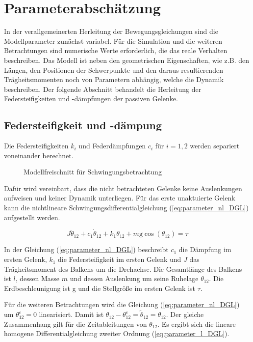 \newpage
\chapter{Parameterabschätzung}

In der verallgemeinerten Herleitung der Bewegungsgleichungen sind die Modellparameter zunächst variabel. Für die Simulation und die weiteren Betrachtungen sind numerische Werte erforderlich, die das reale Verhalten beschreiben. Das Modell ist neben den geometrischen Eigenschaften, wie z.B. den Längen, den Positionen der Schwerpunkte und den daraus resultierenden Trägheitsmomenten noch von Parametern abhängig, welche die Dynamik beschreiben. Der folgende Abschnitt behandelt die Herleitung der Federsteifigkeiten und -dämpfungen der passiven Gelenke.

\section{Federsteifigkeit und -dämpung}
\label{abs:Federparameter}
Die Federsteifigkeiten $k_i$ und Federdämpfungen $c_i$ für $i=1,2$ werden separiert voneinander berechnet. 

\begin{figure}[h]
	\centering
	
	\caption[Modellparameter]{Modellfreischnitt für Schwingungsbetrachtung}
	\label{fig:parameter_abschaetung}
\end{figure}

Dafür wird vereinbart, dass die nicht betrachteten Gelenke keine Auslenkungen aufweisen und keiner Dynamik unterliegen. 
Für das erste unaktuierte Gelenk kann die nichtlineare Schwingungsdifferentialgleichung (\ref{eq:parameter_nl_DGL}) aufgestellt werden. 

\begin{equation} \label{eq:parameter_nl_DGL}
J\ddot{\theta}_{12}+c_1\dot{\theta}_{12}+k_1\theta_{12}+m\mathrm{g}\cos(\theta_{12})=\tau
\end{equation}

In der Gleichung (\ref{eq:parameter_nl_DGL}) beschreibt $c_1$ die Dämpfung im ersten Gelenk, $k_1$ die Federsteifigkeit im ersten Gelenk und $J$ das Trägheitsmoment des Balkens um die Drehachse. Die Gesamtlänge des Balkens ist $l$, dessen Masse $m$ und dessen Auslenkung um seine Ruhelage $\theta_{12}$. Die Erdbeschleunigung ist g und die Stellgröße im ersten Gelenk ist $\tau$.

Für die weiteren Betrachtungen wird die Gleichung (\ref{eq:parameter_nl_DGL}) um $\theta_{12}^e=0$ linearisiert. Damit ist $\theta_{12}-\theta_{12}^e=\tilde{\theta}_{12}=\theta_{12}$. Der gleiche Zusammenhang gilt für die Zeitableitungen von $\theta_{12}$. Es ergibt sich die lineare homogene Differentialgleichung zweiter Ordnung (\ref{eq:parameter_l_DGL}).

